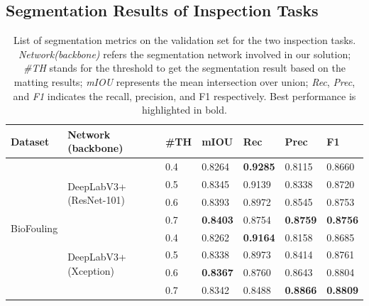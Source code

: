 \documentclass[journal]{IEEEtran}
\begin{document}
\subsection{Segmentation Results of Inspection Tasks}
\label{sec:seg_performance_ins}
\begin{table}[t]
    \centering
    \caption{List of segmentation metrics on the validation set for the two inspection tasks. \textit{Network(backbone)} refers the segmentation network involved in our solution; \textit{\#TH} stands for the threshold to get the segmentation result based on the matting results; \textit{mIOU} represents the mean intersection over union; \textit{Rec}, \textit{Prec}, and \textit{F1} indicates the recall, precision, and F1 respectively. Best performance is highlighted in bold. }
    \label{tab:compare_seg_table}
    \begin{tabular}{p{1.5cm}p{3.5cm}p{1cm}p{1cm}p{1cm}p{1cm}p{1cm}}
        \toprule
        \textbf{Dataset} & \textbf{Network (backbone)}  & \textbf{\#TH}  & \textbf{mIOU} & \textbf{Rec} & \textbf{Prec} & \textbf{F1} \\
        \midrule %
        \multirow{20}{1.5cm}{BioFouling} 
        & \multirow{4}{3.5cm}{DeepLabV3+ (ResNet-101)}  & 0.4      & 0.8264           & \textbf{0.9285} & 0.8115          & 0.8660             \\
        &                                               & 0.5      & 0.8345           & 0.9139          & 0.8338          & 0.8720             \\
        &                                               & 0.6      & 0.8393           & 0.8972          & 0.8545          & 0.8753             \\
        &                                               & 0.7      & \textbf{0.8403}  & 0.8754          & \textbf{0.8759} & \textbf{0.8756}    \\
        \cmidrule{2-7}
        & \multirow{4}{3.5cm}{DeepLabV3+ (Xception)}    & 0.4      & 0.8262           & \textbf{0.9164} & 0.8158          & 0.8685             \\
        &                                               & 0.5      & 0.8338           & 0.8973          & 0.8414          & 0.8761             \\
        &                                               & 0.6      & \textbf{0.8367}  & 0.8760          & 0.8643          & 0.8804             \\
        &                                               & 0.7      & 0.8342           & 0.8488          & \textbf{0.8866} & \textbf{0.8809}    \\

\end{tabular}
\end{table}
\end{document}
